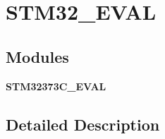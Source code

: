 \section{S\+T\+M32\+\_\+\+E\+V\+AL}
\label{group___s_t_m32___e_v_a_l}
\subsection*{Modules}
\begin{DoxyCompactItemize}
\item 
\textbf{ S\+T\+M32373\+C\+\_\+\+E\+V\+AL}
\end{DoxyCompactItemize}


\subsection{Detailed Description}
